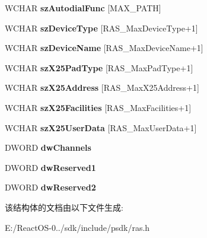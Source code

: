 \begin{DoxyCompactItemize}
W\+C\+H\+AR {\bfseries sz\+Autodial\+Func} \mbox{[}M\+A\+X\+\_\+\+P\+A\+TH\mbox{]}
\item 
\mbox{\label{structtag_r_a_s_e_n_t_r_y_w_a7e799e8c8aeb4cc0e37b860ba85b7951}} 
W\+C\+H\+AR {\bfseries sz\+Device\+Type} \mbox{[}R\+A\+S\+\_\+\+Max\+Device\+Type+1\mbox{]}
\item 
\mbox{\label{structtag_r_a_s_e_n_t_r_y_w_ad15e336040991ae5089a6d94b935276f}} 
W\+C\+H\+AR {\bfseries sz\+Device\+Name} \mbox{[}R\+A\+S\+\_\+\+Max\+Device\+Name+1\mbox{]}
\item 
\mbox{\label{structtag_r_a_s_e_n_t_r_y_w_aab0db4f32395989ff5fff99ebd452860}} 
W\+C\+H\+AR {\bfseries sz\+X25\+Pad\+Type} \mbox{[}R\+A\+S\+\_\+\+Max\+Pad\+Type+1\mbox{]}
\item 
\mbox{\label{structtag_r_a_s_e_n_t_r_y_w_a6cfae4087315373ff965b83446433f07}} 
W\+C\+H\+AR {\bfseries sz\+X25\+Address} \mbox{[}R\+A\+S\+\_\+\+Max\+X25\+Address+1\mbox{]}
\item 
\mbox{\label{structtag_r_a_s_e_n_t_r_y_w_a2c55f624e3eddb3bf3bacb26d097f4af}} 
W\+C\+H\+AR {\bfseries sz\+X25\+Facilities} \mbox{[}R\+A\+S\+\_\+\+Max\+Facilities+1\mbox{]}
\item 
\mbox{\label{structtag_r_a_s_e_n_t_r_y_w_a355237de7765f37d03d25eb9f0c9a18a}} 
W\+C\+H\+AR {\bfseries sz\+X25\+User\+Data} \mbox{[}R\+A\+S\+\_\+\+Max\+User\+Data+1\mbox{]}
\item 
\mbox{\label{structtag_r_a_s_e_n_t_r_y_w_af63601437a4e0a6618dfa8840ca1da3e}} 
D\+W\+O\+RD {\bfseries dw\+Channels}
\item 
\mbox{\label{structtag_r_a_s_e_n_t_r_y_w_a8271c620c28638416b99da8c5c63bf1c}} 
D\+W\+O\+RD {\bfseries dw\+Reserved1}
\item 
\mbox{\label{structtag_r_a_s_e_n_t_r_y_w_a0d0de127b174e4684ccd20ae1ad8142c}} 
D\+W\+O\+RD {\bfseries dw\+Reserved2}
\end{DoxyCompactItemize}


该结构体的文档由以下文件生成\+:\begin{DoxyCompactItemize}
\item 
E\+:/\+React\+O\+S-\/0../sdk/include/psdk/ras.\+h\end{DoxyCompactItemize}
